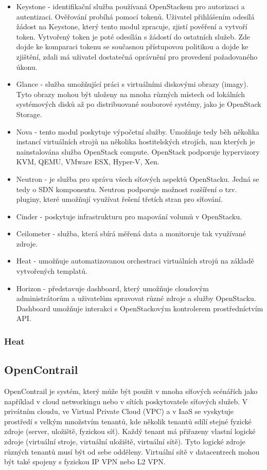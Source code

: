 \begin{itemize}
\item Keystone - identifikační služba používaná OpenStackem pro autorizaci a autentizaci. Ověřování probíhá pomocí tokenů. Uživatel přihlášením odesílá žádost na Keystone, který tento modul zpracuje, zjistí pověření a vytvoří token. Vytvořený token je poté odesílán s žádostí do ostatních služeb. Zde dojde ke komparaci tokenu se současnou přístupovou politikou a dojde ke zjištění, zdali má uživatel dostatečná oprávnění pro provedení požadovaného úkonu.
\item Glance - služba umožňující práci s virtuálními diskovými obrazy (imagy). Tyto obrazy mohou být uloženy na mnoha různých místech od lokálních systémových disků až po distribuované souborové systémy, jako je OpenStack Storage.
\item Nova - tento modul poskytuje výpočetní služby. Umožňuje tedy běh několika instancí virtuálních strojů na několika hostitelských strojích, nan kterých je nainstalována služba OpenStack compute. OpenStack podporuje hypervizory KVM, QEMU, VMware ESX, Hyper-V, Xen. 
\item Neutron - je služba pro správu všech síťových aspektů OpenStacku. Jedná se tedy o SDN komponentu. Neutron podporuje možnost rozšíření o tzv. pluginy, které umožňují využívat řešení třetích stran pro síťování.
\item Cinder - poskytuje infrastrukturu pro mapování volumů v OpenStacku.
\item Ceilometer - služba, která sbírá měřená data a monitoruje tak využívané zdroje.
\item Heat - umožňuje automatizovanou orchestraci virtuálních strojů na základě vytvořených templatů.
\item Horizon - představuje dashboard, který umožňuje cloudovým administrátorům a uživatelům spravovat různé zdroje a služby OpenStacku. Dashboard umožňuje interakci s OpenStackovým kontrolerem prostředníctvím API. 
\end{itemize}

\subsubsection{Heat}

\subsection{OpenContrail} 

OpenContrail je systém, který může být použit v mnoha síťových scénářích jako například v cloud networkingu nebo v sítích poskytovatele síťových služeb. V privátním cloudu, ve Virtual Private Cloud (VPC) a v IaaS se vyskytuje prostředí s velkým množstvím tenantů, kde několik tenantů sdílí stejné fyzické zdroje (server, uložiště, fyzickou síť). Každý tenant má přiřazeny vlastní logické zdroje (virtuální stroje, virtuální uložiště, virtuální sítě). Tyto logické zdroje různých tenantů musí být od sebe odděleny. Virtuální sítě v datacentrech mohou být také spojeny s fyzickou IP VPN nebo L2 VPN. \cite{OpenContrail}

